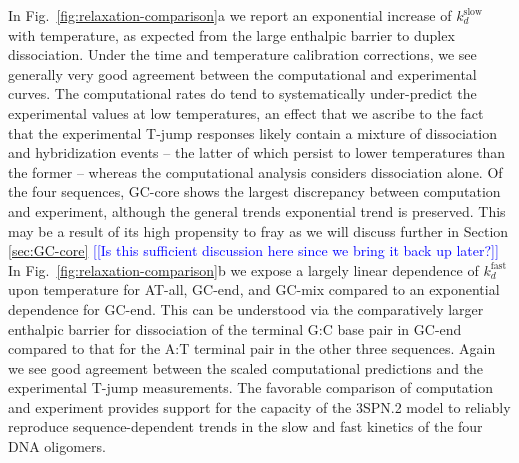 \documentclass[journal=jpcbfk,manuscript=article]{achemso}
\newcommand*{\noteb}[1]{\textcolor{blue}{[[#1]]}}		%
\begin{document}
In Fig.~\ref{fig:relaxation-comparison}a we report an exponential increase of $k_d^\mathrm{slow}$ with temperature, as expected from the large enthalpic barrier to duplex dissociation.\cite{Craig1971RelaxationOligonucleotides,Porschke1971CooperativeTransition,Williams1989LaserDGCATGC} Under the time and temperature calibration corrections, we see generally very good agreement between the computational and experimental curves. The computational rates do tend to systematically under-predict the experimental values at low temperatures, an effect that we ascribe to the fact that the experimental T-jump responses likely contain a mixture of dissociation and hybridization events -- the latter of which persist to lower temperatures than the former -- whereas the computational analysis considers dissociation alone. Of the four sequences, GC-core shows the largest discrepancy between computation and experiment, although the general trends exponential trend is preserved. This may be a result of its high propensity to fray as we will discuss further in Section \ref{sec:GC-core} \noteb{Is this sufficient discussion here since we bring it back up later?} In Fig.~\ref{fig:relaxation-comparison}b we expose a largely linear dependence of $k_d^\mathrm{fast}$ upon temperature for AT-all, GC-end, and GC-mix compared to an exponential dependence for GC-end. This can be understood via the comparatively larger enthalpic barrier for dissociation of the terminal G:C base pair in GC-end compared to that for the A:T terminal pair in the other three sequences. Again we see good agreement between the scaled computational predictions and the experimental T-jump measurements. The favorable comparison of computation and experiment provides support for the capacity of the 3SPN.2 model to reliably reproduce sequence-dependent trends in the slow and fast kinetics of the four DNA oligomers.

\end{document}
